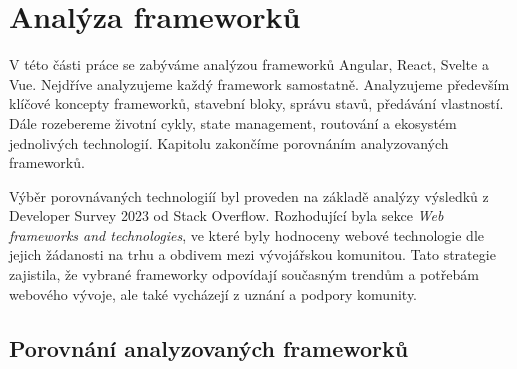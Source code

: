\section{Analýza frameworků}

V této části práce se zabýváme analýzou frameworků Angular, React, Svelte a Vue. Nejdříve analyzujeme každý framework samostatně. 
Analyzujeme především klíčové koncepty frameworků, stavební bloky, správu stavů, předávání vlastností. 
Dále rozebereme životní cykly, state management, routování a ekosystém jednolivých technologií. 
Kapitolu zakončíme porovnáním analyzovaných frameworků.

Výběr porovnávaných technologiíí byl proveden na základě analýzy výsledků z Developer Survey 2023 od Stack Overflow. 
Rozhodující byla sekce \emph{Web frameworks and technologies}, ve které byly hodnoceny webové technologie dle jejich žádanosti na trhu a obdivem mezi vývojářskou komunitou. 
Tato strategie zajistila, že vybrané frameworky odpovídají současným trendům a potřebám webového vývoje, ale také vycházejí z uznání a podpory komunity.\cite{stackoverflow, developersurvey}







\subsection{Porovnání analyzovaných frameworků}

